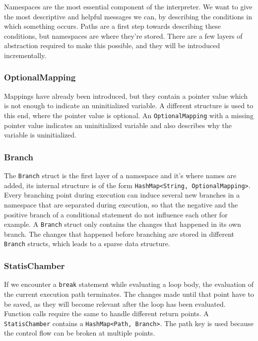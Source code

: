 \documentclass[a4paper, 16pt, oneside]{Thesis}
\begin{document}
Namespaces are the most essential component of the interpreter. We want
to give the most descriptive and helpful messages we can, by describing
the conditions in which something occurs. Paths are a first step towards
describing these conditions, but namespaces are where they're stored.
There are a few layers of abstraction required to make this possible,
and they will be introduced incrementally.

\subsubsection{OptionalMapping}\label{optionalmapping}

Mappings have already been introduced, but they contain a pointer value
which is not enough to indicate an uninitialized variable. A different
structure is used to this end, where the pointer value is optional. An
\texttt{OptionalMapping} with a missing pointer value indicates an
uninitialized variable and also describes why the variable is
uninitialized.

\subsubsection{Branch}\label{branch}

The \texttt{Branch} struct is the first layer of a namespace and it's
where names are added, its internal structure is of the form
\texttt{HashMap\textless{}String,\ OptionalMapping\textgreater{}}. Every
branching point during execution can induce several new branches in a
namespace that are separated during execution, so that the negative and
the positive branch of a conditional statement do not influence each
other for example. A \texttt{Branch} struct only contains the changes
that happened in its own branch. The changes that happened before
branching are stored in different \texttt{Branch} structs, which leads
to a sparse data structure.

\subsubsection{StatisChamber}\label{statischamber}

If we encounter a \texttt{break} statement while evaluating a loop body,
the evaluation of the current execution path terminates. The changes
made until that point have to be saved, as they will become relevant
after the loop has been evaluated. Function calls require the same to
handle different return points. A \texttt{StatisChamber} contains a
\texttt{HashMap\textless{}Path,\ Branch\textgreater{}}. The path key is
used because the control flow can be broken at multiple points.
\end{document}
